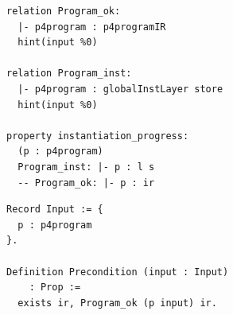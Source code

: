 \begingroup
\setlength{\parindent}{0pt}
\begin{examplerow}
\begin{minipage}[t]{0.5\linewidth}
\vspace{0pt}
\begin{lstlisting}[style=spectecexample,style=examplecolumn]
relation Program_ok:
  |- p4program : p4programIR
  hint(input %0)

relation Program_inst:
  |- p4program : globalInstLayer store
  hint(input %0)

property instantiation_progress:
  (p : p4program)
  Program_inst: |- p : l s
  -- Program_ok: |- p : ir
\end{lstlisting}
\end{minipage}%
\begin{minipage}[t]{0.5\linewidth}
\vspace{0pt}
\begin{lstlisting}[style=propertyrocqexample,style=examplecolumn]
Record Input := {
  p : p4program
}.

Definition Precondition (input : Input)
    : Prop :=
  exists ir, Program_ok (p input) ir.
\end{lstlisting}
\end{minipage}
\end{examplerow}
\begin{minipage}[t]{0.5\linewidth}
\end{minipage}%
\begin{minipage}[t]{0.5\linewidth}
\end{minipage}
\endgroup
